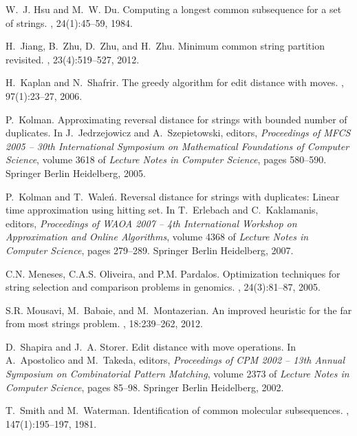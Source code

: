 \documentclass[11pt,a4paper]{article}
\begin{document}
\begin{thebibliography}{10}
W.~J. Hsu and M.~W. Du.
\newblock Computing a longest common subsequence for a set of strings.
, 24(1):45--59, 1984.

H.~Jiang, B.~Zhu, D.~Zhu, and H.~Zhu.
\newblock Minimum common string partition revisited.
, 23(4):519--527, 2012.

H.~Kaplan and N.~Shafrir.
\newblock The greedy algorithm for edit distance with moves.
, 97(1):23--27, 2006.

P.~Kolman.
\newblock Approximating reversal distance for strings with bounded number of
  duplicates.
\newblock In J.~Jedrzejowicz and A.~Szepietowski, editors, {\em Proceedings of
  MFCS 2005 -- 30th International Symposium on Mathematical Foundations of
  Computer Science}, volume 3618 of {\em Lecture Notes in Computer Science},
  pages 580--590. Springer Berlin Heidelberg, 2005.

P.~Kolman and T.~Wale{\'n}.
\newblock Reversal distance for strings with duplicates: Linear time
  approximation using hitting set.
\newblock In T.~Erlebach and C.~Kaklamanis, editors, {\em Proceedings of WAOA
  2007 -- 4th International Workshop on Approximation and Online Algorithms},
  volume 4368 of {\em Lecture Notes in Computer Science}, pages 279--289.
  Springer Berlin Heidelberg, 2007.

C.N. Meneses, C.A.S. Oliveira, and P.M. Pardalos.
\newblock Optimization techniques for string selection and comparison problems
  in genomics.
,
  24(3):81--87, 2005.

S.R. Mousavi, M.~Babaie, and M.~Montazerian.
\newblock An improved heuristic for the far from most strings problem.
, 18:239--262, 2012.

D.~Shapira and J.~A. Storer.
\newblock Edit distance with move operations.
\newblock In A.~Apostolico and M.~Takeda, editors, {\em Proceedings of CPM 2002
  -- 13th Annual Symposium on Combinatorial Pattern Matching}, volume 2373 of
  {\em Lecture Notes in Computer Science}, pages 85--98. Springer Berlin
  Heidelberg, 2002.

T.~Smith and M.~Waterman.
\newblock Identification of common molecular subsequences.
, 147(1):195--197, 1981.

\end{thebibliography}
\end{document}
